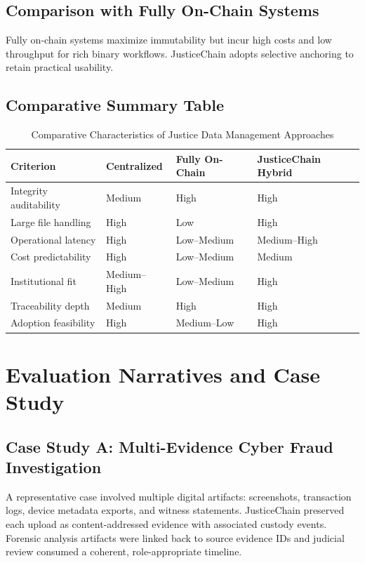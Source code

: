 \documentclass[conference]{IEEEtran}
\begin{document}
\subsection{Comparison with Fully On-Chain Systems}
Fully on-chain systems maximize immutability but incur high costs and low throughput for rich binary workflows. JusticeChain adopts selective anchoring to retain practical usability.

\subsection{Comparative Summary Table}
\begin{table}[!t]
\caption{Comparative Characteristics of Justice Data Management Approaches}
\centering
\begin{tabular}{p{2.35cm} p{1.55cm} p{1.55cm} p{1.55cm}}
\hline
\textbf{Criterion} & \textbf{Centralized} & \textbf{Fully On-Chain} & \textbf{JusticeChain Hybrid} \\
\hline
Integrity auditability & Medium & High & High \\
Large file handling & High & Low & High \\
Operational latency & High & Low--Medium & Medium--High \\
Cost predictability & High & Low--Medium & Medium \\
Institutional fit & Medium--High & Low--Medium & High \\
Traceability depth & Medium & High & High \\
Adoption feasibility & High & Medium--Low & High \\
\hline
\end{tabular}
\end{table}

\section{Evaluation Narratives and Case Study}
\subsection{Case Study A: Multi-Evidence Cyber Fraud Investigation}
A representative case involved multiple digital artifacts: screenshots, transaction logs, device metadata exports, and witness statements. JusticeChain preserved each upload as content-addressed evidence with associated custody events. Forensic analysis artifacts were linked back to source evidence IDs and judicial review consumed a coherent, role-appropriate timeline.
\end{document}
